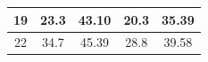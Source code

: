 \documentclass{article}
\begin{document}
\begin{Large}
\begin{table}[h]
\begin{tabular}{|c|cc|cc|}
19                                                                       & \multicolumn{1}{c|}{23.3}                                                    & 43.10                                                       & \multicolumn{1}{c|}{20.3}                                                    & 35.39                                                       \\ \hline
22                                                                       & \multicolumn{1}{c|}{34.7}                                                    & 45.39                                                       & \multicolumn{1}{c|}{28.8}                                                    & 39.58                                                       \\ \hline
\end{tabular}
\end{table}


\newpage

\end{Large}
\end{document}
